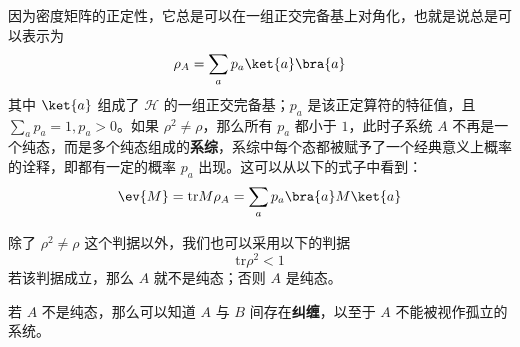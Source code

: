 因为密度矩阵的正定性，它总是可以在一组正交完备基上对角化，也就是说总是可以表示为
\begin{equation}
\rho_A=\sum_a p_a\ket{a}\bra{a}
\end{equation}
其中 $\ket{a}$ 组成了 $\mathcal{H}$ 的一组正交完备基；$p_a$ 是该正定算符的特征值，且 $\sum_a p_a=1,p_a>0$。如果 $\rho^2\neq \rho$，那么所有 $p_a$ 都小于 $1$，此时子系统 $A$ 不再是一个纯态，而是多个纯态组成的\textbf{系综}，系综中每个态都被赋予了一个经典意义上概率的诠释，即都有一定的概率 $p_a$ 出现。这可以从以下的式子中看到：
\begin{equation}
\ev{M}=\text{tr} M\rho_A = \sum_a p_a \bra{a}M\ket{a}
\end{equation}


除了 $\rho^2\neq \rho$ 这个判据以外，我们也可以采用以下的判据
\begin{equation}\label{partra_eq2}
\text{tr} \rho^2 <1
\end{equation}
若该判据成立，那么 $A$ 就不是纯态；否则 $A$ 是纯态。

若 $A$ 不是纯态，那么可以知道 $A$ 与 $B$ 间存在\textbf{纠缠}，以至于 $A$ 不能被视作孤立的系统。